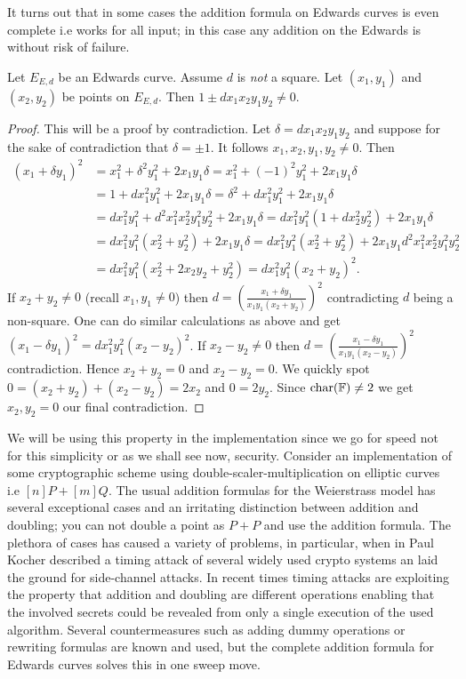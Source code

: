 It turns out that in some cases the addition formula on Edwards curves is even complete i.e works for all input; in this case any addition on the Edwards is without risk of failure. 
\begin{thm}\label{thm:complete}
Let $E_{E,d}$ be an Edwards curve. Assume $d$ is \textit{not} a square. Let $(x_1,y_1)$ and $(x_2,y_2)$ be points on $E_{E,d}$. Then $1\pm dx_1x_2y_1y_2\neq 0$. 
\end{thm} 
\begin{proof}
This will be a proof by contradiction. Let $\delta = dx_1x_2y_1y_2$ and suppose for the sake of contradiction that $\delta=\pm 1$. It follows $x_1,x_2,y_1,y_2\neq 0$. Then 
\begin{align*}
(x_1+\delta y_1)^2 &= x_1^2 +\delta^2 y_1^2+2x_1y_1\delta
= x_1^2 + (-1)^2y_1^2+2x_1y_1\delta \\
&= 1+dx_1^2y_1^2+2x_1y_1\delta 
= \delta^2 +dx_1^2y_1^2+2x_1y_1\delta \\
&= dx_1^2y_1^2+d^2x_1^2x_2^2y_1^2y_2^2+2x_1y_1\delta 
= dx_1^2y_1^2(1+dx_2^2y_2^2)+2x_1y_1\delta \\
&= dx_1^2y_1^2(x_2^2+y_2^2)+2x_1y_1\delta
= dx_1^2y_1^2(x_2^2+y_2^2)+2x_1y_1d^2x_1^2x_2^2y_1^2y_2^2 \\
&= dx_1^2y_1^2(x_2^2+2x_2y_2+y_2^2) 
= dx_1^2y_1^2(x_2+y_2)^2.
\end{align*}
If $x_2+y_2\neq 0$ (recall $x_1,y_1\neq 0$) then $d=\left(\frac{x_1+\delta y_1}{x_1y_1(x_2+y_2)}\right)^2$ contradicting $d$ being a non-square. One can do similar calculations as above and get $(x_1-\delta y_1)^2=dx_1^2y_1^2(x_2-y_2)^2$. If $x_2-y_2\neq 0$ then $d=\left(\frac{x_1-\delta y_1}{x_1y_1(x_2-y_2)}\right)^2$ contradiction. Hence $x_2+y_2=0$ and $x_2-y_2=0$. We quickly spot $0=(x_2+y_2)+(x_2-y_2)=2x_2$ and $0=2y_2$. Since $\text{char}(\mathbb{F})\neq 2$ we get $x_2,y_2=0$ our final contradiction. 
\end{proof}

We will be using this property in the implementation since we go for speed not for this simplicity or as we shall see now, security. Consider an implementation of some cryptographic scheme using double-scaler-multiplication on elliptic curves i.e $[n]P+[m]Q$. The usual addition formulas for the Weierstrass model has several exceptional cases and an irritating distinction between addition and doubling; you can not double a point as $P+P$ and use the addition formula. The plethora of cases has caused a variety of problems, in particular, when in \cite{Kocher96timingattacks} Paul Kocher described a timing attack of several widely used crypto systems an laid the ground for side-channel attacks. In recent times timing attacks are exploiting the property that addition and doubling are different operations enabling that the involved secrets could be revealed from only a single execution of the used algorithm. Several countermeasures such as adding dummy operations or rewriting formulas are known and used, but the complete addition formula for Edwards curves solves this in one sweep move.

